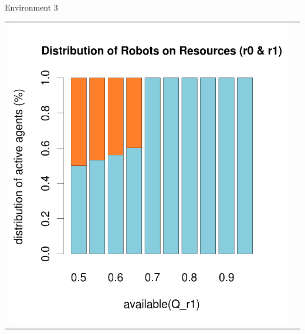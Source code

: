 \documentclass[8pt, handout=show,notes=show]{beamer}
\begin{document}
\begin{frame}{Environment 3}
\begin{table}[H]
\begin{tabular}{cc}
\includegraphics[width=\imgSize]{../images/5StaticEnv/barplotAliveR1AndR2_median_env3_normalized}
\end{tabular}

\end{table}
\end{frame}
\end{document}
